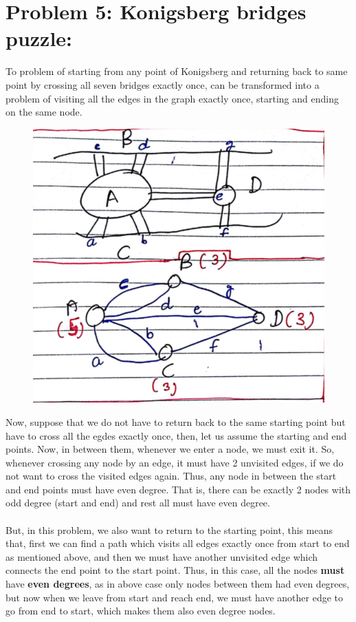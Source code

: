 \documentclass[12pt]{report}
\begin{document}
\section{Problem 5: Konigsberg bridges puzzle:}
To problem of starting from any point of Konigsberg and returning back to same point by crossing all seven bridges exactly once, can be transformed into a problem of visiting all the edges in the graph exactly once, starting and ending on the same node.
\begin{figure}[H]
	\vspace{0pt}
	\includegraphics[width=\linewidth, keepaspectratio]{Snapshots/q5_1.png}
\end{figure}  
Now, suppose that we do not have to return back to the same starting point but have to cross all the egdes exactly once, then, let us assume the starting and end points. Now, in between them, whenever we enter a node, we must exit it. So, whenever crossing any node by an edge, it must have 2 unvisited edges, if we do not want to cross the visited edges again. Thus, any node in between the start and end points must have even degree.
That is, there can be exactly 2 nodes with odd degree (start and end) and rest all must have even degree. 
\\ \\ 
But, in this problem, we also want to return to the starting point, this means that, first we can find a path which visits all edges exactly once from start to end as mentioned above, and then we must have another unvisited edge which connects the end point to the start point. Thus, in this case, all the nodes \textbf{must} have \textbf{even degrees}, as in above case only nodes between them had even degrees, but now when we leave from start and reach end, we must have another edge to go from end to start, which makes them also even degree nodes.
\end{document}
